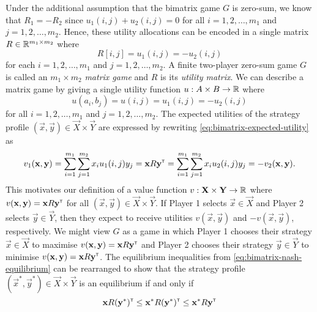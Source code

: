     Under the additional assumption that the bimatrix game $G$ is zero-sum, we know that $R_1 = - R_2$ since $u_1(i, j) + u_2(i, j) = 0$ for all $i = 1, 2, \ldots, m_1$ and $j = 1, 2, \ldots, m_2$.
    Hence, these utility allocations can be encoded in a single matrix $R \in \mathbb{R}^{m_1 \times m_2}$ where
    \[
        R[i, j]
            = u_1(i, j)
            = - u_2(i, j)
    \]
    for each $i = 1, 2, \ldots, m_1$ and $j = 1, 2, \ldots, m_2$.
    A finite two-player zero-sum game $G$ is called an $m_1 \times m_2$ \emph{matrix game} and $R$ is its \emph{utility matrix}.
    We can describe a matrix game by giving a single utility function $u : A \times B \to \mathbb{R}$ where
    \[
        u(a_i, b_j)
            = u(i, j)
            = u_1(i, j)
            = - u_2(i, j)
    \]
    for all $i = 1, 2, \ldots, m_1$ and $j = 1, 2, \ldots, m_2$.
    The expected utilities of the strategy profile $(\vec{x}, \vec{y}) \in \vec{X} \times \vec{Y}$ are expressed by rewriting \eqref{eq:bimatrix-expected-utility} as
    \begin{equation} \label{eq:matrix-expected-utility}
        v_1(\mathbf{x}, \mathbf{y})
            = \sum_{i = 1}^{m_1} \sum_{j = 1}^{m_2} x_i u_1(i, j) y_j
            = \mathbf{x} R \mathbf{y}^{\scriptscriptstyle \mathsf{T}}
            = \sum_{i = 1}^{m_1} \sum_{j = 1}^{m_2} x_i u_2(i, j) y_j
            = - v_2(\mathbf{x}, \mathbf{y}).
    \end{equation}
    This motivates our definition of a value function $v : \mathbf{X} \times \mathbf{Y} \to \mathbb{R}$ where $v(\mathbf{x}, \mathbf{y}) = \mathbf{x} R \mathbf{y}^{\scriptscriptstyle \mathsf{T}}$ for all $(\vec{x}, \vec{y}) \in \vec{X} \times \vec{Y}$.
    If Player 1 selects $\vec{x} \in \vec{X}$ and Player 2 selects $\vec{y} \in \vec{Y}$, then they expect to receive utilities $v(\vec{x}, \vec{y})$ and $-v(\vec{x}, \vec{y})$, respectively.
    We might view $G$ as a game in which Player 1 chooses their strategy $\vec{x} \in \vec{X}$ to maximise $v(\mathbf{x}, \mathbf{y}) = \mathbf{x} R \mathbf{y}^{\scriptscriptstyle \mathsf{T}}$ and Player 2 chooses their strategy $\vec{y} \in \vec{Y}$ to minimise $v(\mathbf{x}, \mathbf{y}) = \mathbf{x} R \mathbf{y}^{\scriptscriptstyle \mathsf{T}}$.
    The equilibrium inequalities from \eqref{eq:bimatrix-nash-equilibrium} can be rearranged to show that the strategy profile $(\vec{x}^*, \vec{y}^*) \in \vec{X} \times \vec{Y}$ is an equilibrium if and only if
    \begin{equation} \label{eq:matrix-nash-equilibrium}
        \mathbf{x} R (\mathbf{y}^*)^{\scriptscriptstyle \mathsf{T}}
            \le \mathbf{x}^* R (\mathbf{y}^*)^{\scriptscriptstyle \mathsf{T}}
            \le \mathbf{x}^* R \mathbf{y}^{\scriptscriptstyle \mathsf{T}}
    \end{equation}
